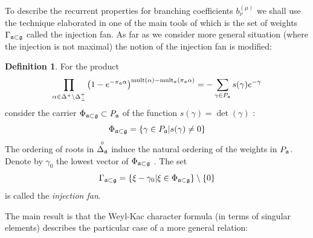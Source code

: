 \documentclass[12pt]{iopart}
\theoremstyle{definition}
\newtheorem{definition}{Definition}
\newcommand{\co}[1]{\stackrel{\circ }{#1}}
\begin{document}
To describe the recurrent properties for branching coefficients $b_{\nu
}^{(\mu )}$ we shall use the technique elaborated in \cite{ilyin812pbc} one of the
main tools of which is the set of weights $\Gamma _{\frak{a}\subset \frak{g}%
} $ called the injection fan. As far as we consider more general situation
(where the injection is not maximal) the notion of the injection fan is
modified:

\begin{definition}
\label{fan-definition} For the product
\begin{equation}
\prod_{\alpha \in \Delta ^{+}\setminus \Delta _{\bot }^{+}}\left( 1-e^{-\pi
_{\frak{a}}\alpha }\right) ^{\mathrm{mult}(\alpha )-\mathrm{mult}_{\frak{a}%
}(\pi _{\frak{a}}\alpha )}=-\sum_{\gamma \in P_{\frak{a}}}s(\gamma
)e^{-\gamma }  \label{eq:6}
\end{equation}
consider the carrier $\Phi _{\frak{a}\subset \frak{g}}\subset P_{\frak{a}}$
of the function $s(\gamma )=\det \left( \gamma \right) $ :
\begin{equation}
\Phi _{\frak{a}\subset \frak{g}}=\left\{ \gamma \in P_{\frak{a}}|s(\gamma
)\neq 0\right\}   \label{eq:37}
\end{equation}
The ordering of roots in $\co{\Delta _{\frak{a}}}$ induce the
natural ordering of the weights in $P_{\frak{a}}$. Denote by $\gamma _{0}$
the lowest vector of $\Phi _{\frak{a}\subset \frak{g}}$ . The set
\begin{equation}
\Gamma _{\frak{a}\subset \frak{g}}=\left\{ \xi -\gamma _{0}|\xi \in \Phi _{%
\frak{a}\subset \frak{g}}\right\} \setminus \left\{ 0\right\}
\label{fan-defined}
\end{equation}
is called the \textit{injection fan}.
\end{definition}

The main result is that the Weyl-Kac character formula (in terms of singular
elements) describes the particular case of a more general relation:
\end{document}
